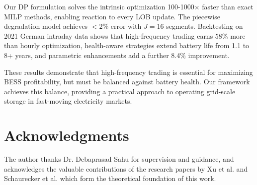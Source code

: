\documentclass[10pt,twocolumn]{article}
\begin{document}
Our DP formulation solves the intrinsic optimization 100-1000$\times$ faster than exact MILP methods, enabling reaction to every LOB update. The piecewise degradation model achieves $<2\%$ error with $J=16$ segments. Backtesting on 2021 German intraday data shows that high-frequency trading earns 58\% more than hourly optimization, health-aware strategies extend battery life from 1.1 to 8+ years, and parametric enhancements add a further 8.4\% improvement.

These results demonstrate that high-frequency trading is essential for maximizing BESS profitability, but must be balanced against battery health. Our framework achieves this balance, providing a practical approach to operating grid-scale storage in fast-moving electricity markets.

\section*{Acknowledgments}
The author thanks Dr. Debaprasad Sahu for supervision and guidance, and acknowledges the valuable contributions of the research papers by Xu et al. \cite{xu2017factoring} and Schaurecker et al. \cite{schaurecker2025maximizing} which form the theoretical foundation of this work.
\end{document}
